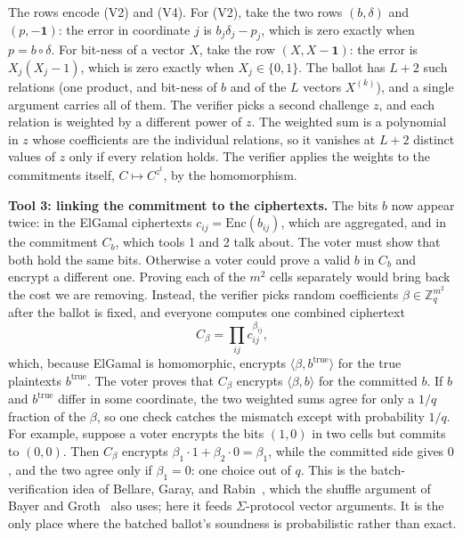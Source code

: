 The rows encode (V2) and (V4). For (V2), take the two rows $(b, \delta)$
and $(p, -\mathbf{1})$: the error in coordinate $j$ is $b_j \delta_j -
p_j$, which is zero exactly when $p = b \circ \delta$. For bit-ness of a
vector $X$, take the row $(X, X - \mathbf{1})$: the error is $X_j (X_j -
1)$, which is zero exactly when $X_j \in \{0, 1\}$. The ballot has $L +
2$ such relations (one product, and bit-ness of $b$ and of the $L$
vectors $X^{(k)}$), and a single argument carries all of them. The
verifier picks a second challenge $z$, and each relation is weighted by
a different power of $z$. The weighted sum is a polynomial in $z$ whose
coefficients are the individual relations, so it vanishes at $L + 2$
distinct values of $z$ only if every relation holds. The verifier applies
the weights to the commitments itself, $C \mapsto C^{z^t}$, by the
homomorphism.

\textbf{Tool 3: linking the commitment to the ciphertexts.} The bits $b$
now appear twice: in the ElGamal ciphertexts $c_{ij} =
\mathrm{Enc}(b_{ij})$, which are aggregated, and in the commitment $C_b$,
which tools 1 and 2 talk about. The voter must show that both hold the
same bits. Otherwise a voter could prove a valid $b$ in $C_b$ and encrypt
a different one. Proving each of the $m^2$ cells separately would bring
back the cost we are removing. Instead, the verifier picks random
coefficients $\beta \in \mathbb{Z}_q^{m^2}$ after the ballot is fixed,
and everyone computes one combined ciphertext
\[
  C_\beta = \textstyle\prod_{ij} c_{ij}^{\beta_{ij}},
\]
which, because ElGamal is homomorphic, encrypts $\langle \beta,
b^{\mathrm{true}} \rangle$ for the true plaintexts $b^{\mathrm{true}}$.
The voter proves that $C_\beta$ encrypts $\langle \beta, b \rangle$ for
the committed $b$. If $b$ and $b^{\mathrm{true}}$ differ in some
coordinate, the two weighted sums agree for only a $1/q$ fraction of the
$\beta$, so one check catches the mismatch except with probability
$1/q$. For example, suppose a voter encrypts the bits $(1, 0)$ in two
cells but commits to $(0, 0)$. Then $C_\beta$ encrypts $\beta_1 \cdot 1 +
\beta_2 \cdot 0 = \beta_1$, while the committed side gives $0$, and the
two agree only if $\beta_1 = 0$: one choice out of $q$. This is the batch-verification idea of Bellare, Garay, and
Rabin~\cite{bgr98}, which the shuffle argument of Bayer and
Groth~\cite{10.1007/978-3-642-29011-4_17} also uses; here it feeds
$\Sigma$-protocol vector arguments. It is the only place where the
batched ballot's soundness is probabilistic rather than exact.

